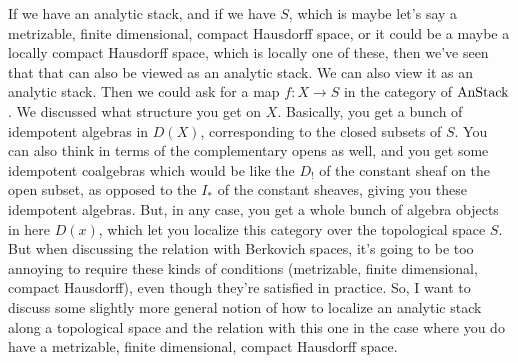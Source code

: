 If we have an analytic stack, and if we have $S$, which is maybe let's say a metrizable, finite dimensional, compact Hausdorff space, or it could be a maybe a locally compact Hausdorff space, which is locally one of these, then we've seen that that can also be viewed as an analytic stack. We can also view it as an analytic stack. Then we could ask for a map $f: X \rightarrow S$ in the category of $\text{AnStack}$. 
We discussed what structure you get on $X$. Basically, you get a bunch of idempotent algebras in $D(X)$, corresponding to the closed subsets of $S$. You can also think in terms of the complementary opens as well, and you get some idempotent coalgebras which would be like the $D_{!}$  of the constant sheaf on the open subset, as opposed to the $I_{*}$ of the constant sheaves, giving you these idempotent algebras. But, in any case, you get a whole bunch of algebra objects in here $D(x)$, which let you localize this category over the topological space $S$.
But when discussing the relation with Berkovich spaces, it's going to be too annoying to require these kinds of conditions (metrizable, finite dimensional, compact Hausdorff), even though they're satisfied in practice. So, I want to discuss some slightly more general notion of how to localize an analytic stack along a topological space and the relation with this one in the case where you do have a metrizable, finite dimensional, compact Hausdorff space.
